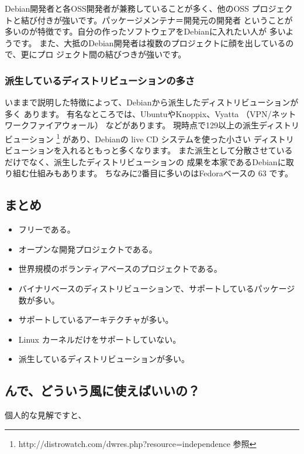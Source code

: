 \documentclass[mingoth,a4paper]{jsarticle}
\begin{document}
Debian開発者と各OSS開発者が兼務していることが多く、他のOSS
プロジェクトと結び付きが強いです。パッケージメンテナ＝開発元の開発者
ということが多いのが特徴です。自分の作ったソフトウェアをDebianに入れたい人が
多いようです。
また、大抵のDebian開発者は複数のプロジェクトに顔を出しているので、更にプロ
ジェクト間の結びつきが強いです。

\subsubsection{派生しているディストリビューションの多さ}
いままで説明した特徴によって、Debianから派生したディストリビューションが多く
あります。
有名なところでは、UbuntuやKnoppix、Vyatta （VPN/ネットワークファイアウォール）
などがあります。
現時点で129以上の派生ディストリビューション
\footnote{http://distrowatch.com/dwres.php?resource=independence 参照}
があり、Debianの live CD システムを使った小さい
ディストリビューションを入れるともっと多くなります。
また派生として分散させているだけでなく、派生したディストリビューションの
成果を本家であるDebianに取り組む仕組みもあります。
ちなみに2番目に多いのはFedoraベースの 63 です。

\subsection{まとめ}

\begin{itemize}
\item フリーである。
\item オープンな開発プロジェクトである。
\item 世界規模のボランティアベースのプロジェクトである。
\item バイナリベースのディストリビューションで、サポートしているパッケージ数が多い。
\item サポートしているアーキテクチャが多い。
\item Linux カーネルだけをサポートしていない。
\item 派生しているディストリビューションが多い。
\end{itemize}

\subsection{んで、どういう風に使えばいいの？}

個人的な見解ですと、
\end{document}
